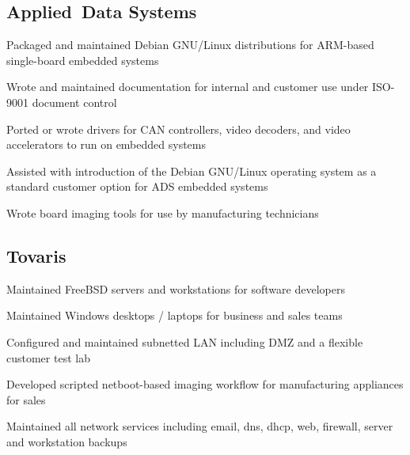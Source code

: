 \documentclass[letterpaper]{deedy-resume-openfont}
\begin{document}
\vspace{6pt}
\subsection{Applied\ Data Systems}
\vspace{2pt}

\begin{tightemize}
	\item Packaged and maintained Debian GNU/Linux distributions for ARM-based single-board embedded systems
	\item Wrote and maintained documentation for internal and customer use under ISO-9001 document control
	\item Ported or wrote drivers for CAN controllers, video decoders, and video accelerators to run on embedded systems
	\item Assisted with introduction of the Debian GNU/Linux operating system as a	standard customer option for ADS embedded systems
	\item Wrote board imaging tools for use by manufacturing technicians
\end{tightemize}

\vspace{6pt}
\subsection{Tovaris}
\vspace{2pt}

\begin{tightemize}
	\item Maintained FreeBSD servers and workstations for software developers
	\item Maintained Windows desktops / laptops for business and sales teams
	\item Configured and maintained subnetted LAN including DMZ and a flexible customer test lab
	\item Developed scripted netboot-based imaging workflow for manufacturing appliances for sales
	\item Maintained all network services including email, dns, dhcp, web, firewall, server and workstation backups
\end{tightemize}
\vspace{20pt}
\end{document}
